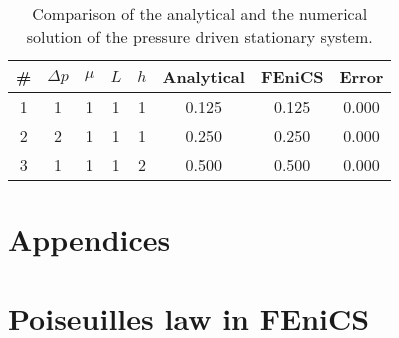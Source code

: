 \documentclass[a4paper,10pt]{article}
\renewcommand{\(}{\left(}
\renewcommand{\)}{\right)}
\begin{document}
\begin{table}[h!]
  \begin{center}
    \begin{tabular}[width=4in]{|c|c|c|c|c|c|c|c|}
      \hline
      \# & $\Delta p$ & $\mu$ & $L$ & $h$ & Analytical & FEniCS & Error\\ \hline
      1 & 1 & 1 & 1 & 1 & 0.125 & 0.125 & 0.000\\
      2 & 2 & 1 & 1 & 1 & 0.250 & 0.250 & 0.000\\
      3 & 1 & 1 & 1 & 2 & 0.500 & 0.500 & 0.000\\
      \hline
    \end{tabular}
  \caption{Comparison of the analytical and the numerical solution of the pressure driven stationary system.}
  \label{tab:res_hagen_poiseuille}
  \end{center}
\end{table}

\section{Appendices}
\appendix
\section{Poiseuilles law in FEniCS}
\label{ap:a}


\printbibliography
\end{document}

